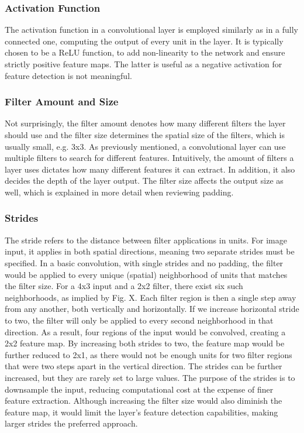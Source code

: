 \subsubsection{Activation Function}

The activation function in a convolutional layer is employed similarly as in a fully connected one, computing the output of every unit in the layer. It is typically chosen to be a ReLU function, to add non-linearity to the network and ensure strictly positive feature maps. The latter is useful as a negative activation for feature detection is not meaningful.

\subsubsection{Filter Amount and Size}

Not surprisingly, the filter amount denotes how many different filters the layer should use and the filter size determines the spatial size of the filters, which is usually small, e.g. 3x3. As previously mentioned, a convolutional layer can use multiple filters to search for different features. Intuitively, the amount of filters a layer uses dictates how many different features it can extract. In addition, it also decides the depth of the layer output. The filter size affects the output size as well, which is explained in more detail when reviewing padding.

\subsubsection{Strides}

The stride refers to the distance between filter applications in units. For image input, it applies in both spatial directions, meaning two separate strides must be specified. In a basic convolution, with single strides and no padding, the filter would be applied to every unique (spatial) neighborhood of units that matches the filter size. For a 4x3 input and a 2x2 filter, there exist six such neighborhoods, as implied by Fig. X. Each filter region is then a single step away from any another, both vertically and horizontally. If we increase horizontal stride to two, the filter will only be applied to every second neighborhood in that direction. As a result, four regions of the input would be convolved, creating a 2x2 feature map. By increasing both strides to two, the feature map would be further reduced to 2x1, as there would not be enough units for two filter regions that were two steps apart in the vertical direction. The strides can be further increased, but they are rarely set to large values. The purpose of the strides is to downsample the input, reducing computational cost at the expense of finer feature extraction. Although increasing the filter size would also diminish the feature map, it would limit the layer's feature detection capabilities, making larger strides the preferred approach.

